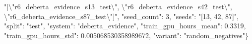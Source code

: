 "[\textbackslash{}"r6\_deberta\_evidence\_s13\_test\textbackslash{}", \textbackslash{}"r6\_deberta\_evidence\_s42\_test\textbackslash{}", \textbackslash{}"r6\_deberta\_evidence\_s87\_test\textbackslash{}"]", "seed\_count": 3, "seeds": "[13, 42, 87]", "split": "test", "system": "deberta\_evidence", "train\_gpu\_hours\_mean": 0.3319, "train\_gpu\_hours\_std": 0.005068530358989672, "variant": "random\_negatives"\}
